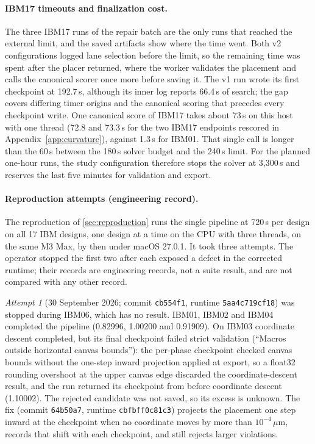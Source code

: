 \paragraph{IBM17 timeouts and finalization cost.} The three IBM17 runs of the repair
batch are the only runs that reached the external limit, and the saved artifacts show
where the time went. Both v2 configurations logged lane selection before the limit, so
the remaining time was spent after the placer returned, where the worker validates the
placement and calls the canonical scorer once more before saving it. The v1 run wrote
its first checkpoint at 192.7\,s, although its inner log reports 66.4\,s of search; the
gap covers differing timer origins and the canonical scoring that precedes every
checkpoint write. One canonical score of IBM17 takes
about 73\,s on this host with one thread (72.8 and 73.3\,s for the two IBM17 endpoints
rescored in Appendix~\ref{app:curvature}), against 1.3\,s for IBM01. That single call
is longer than the 60\,s between the 180\,s solver budget and the 240\,s limit. For the
planned one-hour runs, the study configuration therefore stops the solver at 3,300\,s
and reserves the last five minutes for validation and export.

\paragraph{Reproduction attempts (engineering record).}\label{app:repro-attempts}
The reproduction of \cref{sec:reproduction} runs the single pipeline at 720\,s per
design on all 17 IBM designs, one design at a time on the CPU with three threads, on
the same M3 Max, by then under macOS 27.0.1. It took three attempts. The operator
stopped the first two after each exposed a defect in the corrected runtime; their
records are engineering records, not a suite result, and are not compared with any
other record.

\emph{Attempt 1} (30 September 2026; commit \texttt{cb554f1}, runtime
\texttt{5aa4c719cf18}) was stopped during IBM06, which has no result. IBM01, IBM02 and
IBM04 completed the pipeline (0.82996, 1.00200 and 0.91909). On IBM03 coordinate
descent completed, but its final checkpoint failed strict validation (``Macros
outside horizontal canvas bounds''): the per-phase checkpoint checked canvas bounds
without the one-step inward projection applied at export, so a float32 rounding
overshoot at the upper canvas edge discarded the coordinate-descent result, and the
run returned its checkpoint from before coordinate descent (1.10002). The rejected
candidate was not saved, so its excess is unknown. The fix (commit \texttt{64b50a7},
runtime \texttt{cbfbff0c81c3}) projects the placement one step inward at the
checkpoint when no coordinate moves by more than $10^{-4}\,\mu$m, records that shift
with each checkpoint, and still rejects larger violations.

